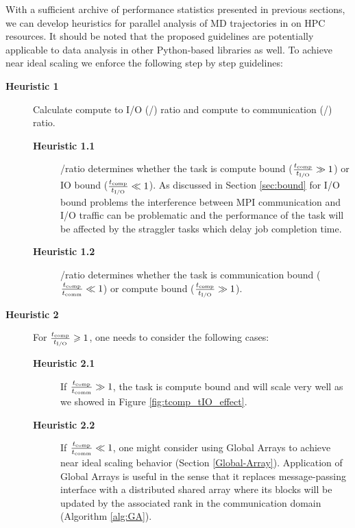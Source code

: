 \label{guideline}
With a sufficient archive of performance statistics presented in previous sections, we can develop heuristics for parallel analysis of MD trajectories in  on HPC resources.
It should be noted that the proposed guidelines are potentially applicable to data analysis in other Python-based libraries as well.
To achieve near ideal scaling we enforce the following step by step guidelines:

\begin{description}
  \item[\textbf{Heuristic 1}] Calculate compute to I/O (\tcomp/\tIO) ratio and compute to communication (\tcomp/\tcomm) ratio. 
  \begin{description}
  \item[\textbf{Heuristic 1.1}] \tcomp/\tIO ratio determines whether the task is compute bound ($\frac{{t}_{\text{comp}}}{{t}_{\text{I/O}}} \gg 1$) or IO bound ($\frac{{t}_{\text{comp}}}{{t}_{\text{I/O}}} \ll 1$). 
  As discussed in Section \ref{sec:bound} for I/O bound problems the interference between MPI communication and I/O traffic can be problematic \cite{VMD2013, Kevin2018} and the performance of the task will be affected by the straggler tasks which delay job completion time.  
  \item[\textbf{Heuristic 1.2}] \tcomp/\tcomm ratio determines whether the task is communication bound ($\frac{{t}_{\text{comp}}}{t_{\text{comm}}} \ll 1$) or compute bound ($\frac{{t}_{\text{comp}}}{{t}_{\text{I/O}}} \gg 1$).
  \end{description}
  
  \item[\textbf{Heuristic 2}] For $\frac{{t}_{\text{comp}}}{{t}_{\text{I/O}}} \geqslant 1$, one needs to consider the following cases: 
  \begin{description}
  \item[\textbf{Heuristic 2.1}] If $\frac{{t}_{\text{comp}}}{t_{\text{comm}}} \gg 1$, the task is compute bound and will scale very well as we showed in Figure \ref{fig:tcomp_tIO_effect}.
  \item[\textbf{Heuristic 2.2}] If $\frac{{t}_{\text{comp}}}{t_{\text{comm}}} \ll 1$, one might consider using Global Arrays to achieve near ideal scaling behavior (Section \ref{Global-Array}). 
  Application of Global Arrays is useful in the sense that it replaces message-passing interface with a distributed shared array where its 
  blocks will be updated by the associated rank in the communication domain (Algorithm \ref{alg:GA}). 
  \end{description}
  

\end{description}
